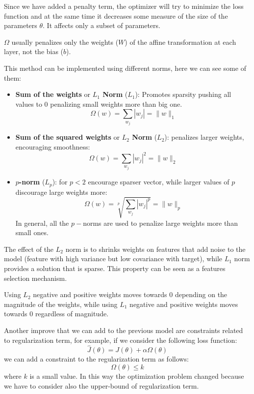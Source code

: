 Since we have added a penalty term, the optimizer will try to minimize the loss
function and at the same time it decreases some measure of the size of the
parameters $\theta$. It affects only a subset of parameters.

$\Omega$ usually penalizes only the weights ($W$) of the affine transformation
at each layer, not the bias ($b$).

This method can be implemented using different norms, here we can see some of them:
\begin{itemize}
    \item \textbf{Sum of the weights} or \textbf{$L_1$ Norm} ($L_1$): Promotes
          sparsity pushing all values to $0$ penalizing small weights more than big one.
          \begin{equation}
              \Omega(w) = \sum_{w_j}|w_j| = \|w\|_1
          \end{equation}
    \item \textbf{Sum of the squared weights} or \textbf{$L_2$ Norm} ($L_2$):
          penalizes larger weights, encouraging smoothness:
          \begin{equation}
              \Omega(w) = \sum_{w_j}|w_j|^2 = \|w\|_2
          \end{equation}
    \item \textbf{$p$-norm} ($L_p$): for $p < 2$ encourage sparser vector, while
          larger values of $p$ discourage large weights more:
          \begin{equation}
              \Omega(w) = \sqrt[p]{\sum_{w_j}|w_j|^p} = \|w\|_p
          \end{equation}
          In general, all the $p-$norms are used to penalize large weights more
          than small ones.
\end{itemize}

The effect of the $L_2$ norm is to shrinks weights on features that add noise to
the model (feature with high variance but low covariance with target), while
$L_1$ norm provides a solution that is sparse. This property can be seen as a
features selection mechanism.
\begin{note}
    Using $L_2$ negative and positive weights moves towards 0 depending on the
    magnitude of the weights, while using $L_1$ negative and positive weights
    moves towards 0 regardless of magnitude.
\end{note}

Another improve that we can add to the previous model are constraints related to
regularization term, for example, if we consider the following loss function:
\begin{equation}
    \hat{J}(\theta) = J(\theta) + \alpha \Omega(\theta)
\end{equation}
we can add a constraint to the regularization term as follows:
\begin{equation}
    \Omega(\theta) \le k
\end{equation}
where $k$ is a small value. In this way the optimization problem changed because
we have to consider also the upper-bound of regularization term.

